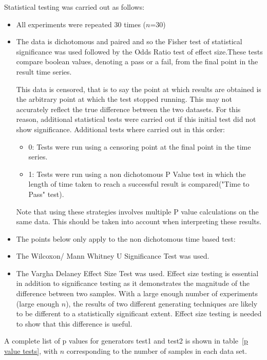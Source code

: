 \documentclass[]{article}
\begin{document}
Statistical testing was carried out as follows: 
\begin{itemize}
\item{All experiments were repeated 30 times ($n$=30)}
\item{The data is dichotomous and paired and so the Fisher test of statistical significance was used followed by the Odds Ratio test of effect size.These tests compare boolean values, denoting a pass or a fail, from the final point in the result time series. 

This data is censored, that is to say the point at which results are obtained is the arbitrary point at which the test stopped running. This may not accurately reflect the true difference between the two datasets. For this reason, additional statistical tests were carried out if this initial test did not show significance. Additional tests where carried out in this order:
\begin{itemize}
\item{0: Tests were run using a censoring point at the final point in the time series.}
\item{1: Tests were run using a non dichotomous P Value test in which the length of time taken to reach a successful result is compared("Time to Pass" test).}
\end{itemize}Note that using these strategies involves multiple P value calculations on the same data. This should be taken into account when interpreting these results.
}
\item{The points below only apply to the non dichotomous time based test:}
\item{The Wilcoxon/ Mann Whitney U Significance Test was used.}
\item{The Vargha Delaney Effect Size Test was used. Effect size testing is essential in addition to significance testing as it demonstrates the magnitude of the difference between two samples. With a large enough number of experiments (large enough $n$), the results of two different generating techniques are likely to be different to a statistically significant extent. Effect size testing is needed to show that this difference is useful.}
\end{itemize}A complete list of p values for generators test1 and test2 is shown in table~\ref{p value tests}, with $n$ corresponding to the number of samples in each data set.
\end{document}
